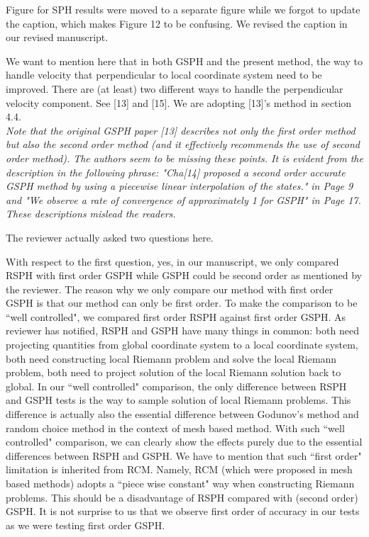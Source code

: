 \documentclass[10pt,a4paper]{article}
\begin{document}
Figure for SPH results were moved to a separate figure while we forgot to update the caption, which makes Figure 12 to be confusing. We revised the caption in our revised manuscript. 

We want to mention here that in both GSPH and the present method, the way to handle velocity that perpendicular to local coordinate system need to be improved. There are (at least) two different ways to handle the perpendicular velocity component. See [13] and [15]. We are adopting [13]'s method in section 4.4. 
\\[3pt]


\textit{Note that the original GSPH paper [13] describes not only the first order method but also the second order method (and it effectively recommends the use of second order method). The authors seem to be missing these points. It is evident from the description in the following phrase: "Cha[14] proposed a second order accurate GSPH method by using a piecewise linear interpolation of the states." in Page 9 and "We observe a rate of convergence of approximately 1 for GSPH" in Page 17. These descriptions mislead the readers.}

The reviewer actually asked two questions here.
 
With respect to the first question, yes, in our manuscript, we only compared RSPH with first order GSPH while GSPH could be second order as mentioned by the reviewer. The reason why we only compare our method with first order GSPH is that our method can only be first order. To make the comparison to be ``well controlled", we compared first order RSPH against first order GSPH. As reviewer has notified, RSPH and GSPH have many things in common: both need projecting quantities from global coordinate system to a local coordinate system, both need constructing local Riemann problem and solve the local Riemann problem, both need to project solution of the local Riemann solution back to global. In our ``well controlled" comparison, the only difference between RSPH and GSPH tests is the way to sample solution of local Riemann problems. This difference is actually also the essential difference between Godunov's method and random choice method in the context of mesh based method. With such ``well controlled" comparison, we can clearly show the effects purely due to the essential differences between RSPH and GSPH. We have to mention that such ``first order" limitation is inherited from RCM. Namely, RCM (which were proposed in mesh based methods) adopts a ``piece wise constant" way when constructing Riemann problems. This should be a disadvantage of RSPH compared with (second order) GSPH.
It is not surprise to us that we observe first order of accuracy in our tests as we were testing first order GSPH.
\end{document}
